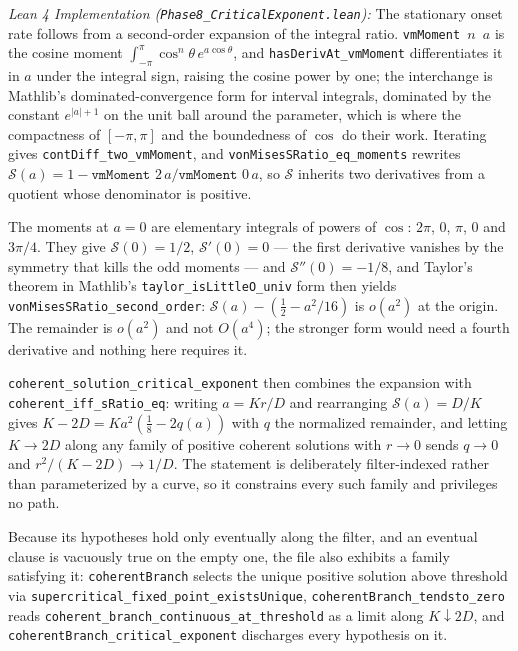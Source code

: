 \documentclass{article}
\begin{document}
\textit{Lean 4 Implementation (\nolinkurl{Phase8_CriticalExponent.lean}):} The stationary onset rate follows from a second-order expansion of the integral ratio. \texttt{vmMoment $n$ $a$} is the cosine moment $\int_{-\pi}^{\pi}\cos^{n}\!\theta\,e^{a\cos\theta}$, and \nolinkurl{hasDerivAt_vmMoment} differentiates it in $a$ under the integral sign, raising the cosine power by one; the interchange is Mathlib's dominated-convergence form for interval integrals, dominated by the constant $e^{|a|+1}$ on the unit ball around the parameter, which is where the compactness of $[-\pi,\pi]$ and the boundedness of $\cos$ do their work. Iterating gives \nolinkurl{contDiff_two_vmMoment}, and \nolinkurl{vonMisesSRatio_eq_moments} rewrites $\mathcal{S}(a) = 1 - \texttt{vmMoment }2\,a/\texttt{vmMoment }0\,a$, so $\mathcal{S}$ inherits two derivatives from a quotient whose denominator is positive.

The moments at $a=0$ are elementary integrals of powers of $\cos$: $2\pi$, $0$, $\pi$, $0$ and $3\pi/4$. They give $\mathcal{S}(0) = 1/2$, $\mathcal{S}'(0) = 0$ --- the first derivative vanishes by the symmetry that kills the odd moments --- and $\mathcal{S}''(0) = -1/8$, and Taylor's theorem in Mathlib's \nolinkurl{taylor_isLittleO_univ} form then yields \nolinkurl{vonMisesSRatio_second_order}: $\mathcal{S}(a) - (\tfrac12 - a^{2}/16)$ is $o(a^{2})$ at the origin. The remainder is $o(a^{2})$ and not $O(a^{4})$; the stronger form would need a fourth derivative and nothing here requires it.

\nolinkurl{coherent_solution_critical_exponent} then combines the expansion with \nolinkurl{coherent_iff_sRatio_eq}: writing $a = Kr/D$ and rearranging $\mathcal{S}(a) = D/K$ gives $K - 2D = K a^{2}(\tfrac18 - 2q(a))$ with $q$ the normalized remainder, and letting $K \to 2D$ along any family of positive coherent solutions with $r \to 0$ sends $q \to 0$ and $r^{2}/(K-2D) \to 1/D$. The statement is deliberately filter-indexed rather than parameterized by a curve, so it constrains every such family and privileges no path.

Because its hypotheses hold only eventually along the filter, and an eventual clause is vacuously true on the empty one, the file also exhibits a family satisfying it: \texttt{coherentBranch} selects the unique positive solution above threshold via \nolinkurl{supercritical_fixed_point_existsUnique}, \nolinkurl{coherentBranch_tendsto_zero} reads \nolinkurl{coherent_branch_continuous_at_threshold} as a limit along $K \downarrow 2D$, and \nolinkurl{coherentBranch_critical_exponent} discharges every hypothesis on it.
\end{document}
